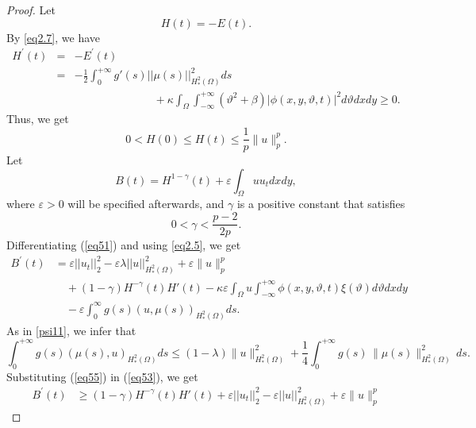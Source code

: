 \documentclass[12pt]{article}
\numberwithin{equation}{section}
\begin{document}
\begin{proof}
Let
\begin{equation*}
H(t)= -E(t).
\end{equation*}
By \eqref{eq2.7}, we have
\begin{eqnarray}\label{eq49}
H^{\prime}(t)&=&-E^{\prime}(t)\nonumber\\
&=& -\frac{1}{2} \int_0^{+\infty} g'(s) ||\mu(s)||^2_{H^2_{*}(\Omega)} ds\nonumber\\
&&\hspace{3cm}+\kappa \int_\Omega \int_{-\infty}^{+\infty} (\vartheta^2 + \beta) |\phi(x,y,\vartheta,t)|^2 d\vartheta dx dy \geq 0.
\end{eqnarray}
Thus, we get
\begin{equation}\label{eq5.6}
0 < H(0) \leq H(t) \leq \frac {1}{p}\|u\|_{p}^{p}.
\end{equation}
Let
\begin{equation} \label{eq51}
B(t) = H^{1-\gamma} (t) + \varepsilon \int_\Omega u u_t dx dy,
\end{equation}
where $\varepsilon > 0$ will be specified afterwards, and $\gamma$ is a positive constant that satisfies
\begin{equation}
0 < \gamma < \frac{p-2}{2p}.
\end{equation}
Differentiating (\ref{eq51}) and using \eqref{eq2.5}, we get
\begin{equation}
\begin{split}
B^{\prime}(t)
& =  \varepsilon  ||u_t||_2^2 - \varepsilon \lambda ||u||^2_{H^2_{*}(\Omega)}+\varepsilon\|u\|_{p}^{p}
\\
&\quad +(1 - \gamma) H^{-\gamma}(t) H'(t) -\kappa \varepsilon \int_\Omega u \int_{-\infty}^{+\infty}  \phi(x,y,\vartheta,t)\xi(\vartheta) d\vartheta dx dy
\\
&\quad -\varepsilon \displaystyle\int_{0}^{\infty} g(s) (u, \mu(s))_{H^2_{*}(\Omega)} ds.
\end{split}
\label{eq53}
\end{equation}
As in \eqref{psi11}, we infer that
\begin{equation}\label{eq55}
\int_{0}^{+\infty} g(s) ( \mu(s), u)_{H_*^{2}(\Omega)}ds\le (1-\lambda)\|u\|^2_{H^2_*(\Omega)}
  + \frac{1}{4}\int_{0}^{+\infty} g(s)\,\|\mu(s)\|_{H_*^{2}(\Omega)}^{2}\,ds.
\end{equation}
Substituting (\ref{eq55}) in (\ref{eq53}), we get
\begin{equation}
\begin{split}
B^{\prime}(t)
& \geq (1-\gamma) H^{-\gamma} (t)  H' (t)+ \varepsilon ||u_t||_2^2 -\varepsilon ||u||^2_{H_*^{2}(\Omega)}+\varepsilon\|u\|_{p}^{p}

\end{split}
\end{equation}
\end{proof}
\end{document}
